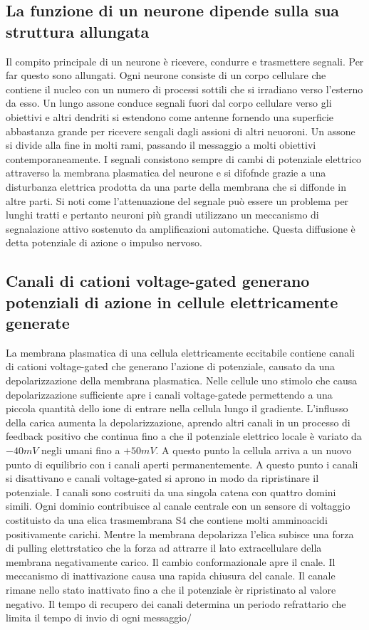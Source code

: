 \subsection{La funzione di un neurone dipende sulla sua struttura allungata}
Il compito principale di un neurone \`e ricevere, condurre e trasmettere segnali. Per far questo sono allungati. Ogni neurone consiste di un corpo cellulare che contiene il nucleo con
un numero di processi sottili che si irradiano verso l'esterno da esso. Un lungo assone conduce segnali fuori dal corpo cellulare verso gli obiettivi e altri dendriti si estendono
come antenne fornendo una superficie abbastanza grande per ricevere sengali dagli assioni di altri neuoroni. Un assone si divide alla fine in molti rami, passando il messaggio a 
molti obiettivi contemporaneamente. I segnali consistono sempre di cambi di potenziale elettrico attraverso la membrana plasmatica del neurone e si difofnde grazie a una disturbanza
elettrica prodotta da una parte della membrana che si diffonde in altre parti. Si noti come l'attenuazione del segnale pu\`o essere un problema per lunghi tratti e pertanto neuroni pi\`u
grandi utilizzano un meccanismo di segnalazione attivo sostenuto da amplificazioni automatiche. Questa diffusione \`e detta potenziale di azione o impulso nervoso. 
\subsection{Canali di cationi voltage-gated generano potenziali di azione in cellule elettricamente generate}
La membrana plasmatica di una cellula elettricamente eccitabile contiene canali di cationi voltage-gated che generano l'azione di potenziale, causato da una depolarizzazione della
membrana plasmatica. Nelle cellule uno stimolo che causa depolarizzazione sufficiente apre i canali voltage-gatede  permettendo a una piccola quantit\`a dello ione di entrare
nella cellula lungo il gradiente. L'influsso della carica aumenta la depolarizzazione, aprendo altri canali in un processo di feedback positivo che continua fino a che il potenziale
elettrico locale \`e variato da $-40mV$ negli umani fino a $+50mV$. A questo punto la cellula arriva a un nuovo punto di equilibrio con i canali  aperti permanentemente. A
questo punto i canali  si disattivano e canali voltage-gated  si aprono in modo da ripristinare il potenziale. I canali  sono costruiti da una singola catena
con quattro domini simili. Ogni dominio contribuisce al canale centrale con un sensore di voltaggio costituisto da una elica trasmembrana S4 che contiene molti amminoacidi positivamente
carichi. Mentre la membrana depolarizza l'elica subisce una forza di pulling elettrstatico che la forza ad attrarre il lato extracellulare della membrana negativamente carico. Il
cambio conformazionale apre il cnale. Il meccanismo di inattivazione causa una rapida chiusura del canale. Il canale rimane nello stato inattivato fino a che il potenziale
\`er ripristinato al valore negativo. Il tempo di recupero dei canali determina un periodo refrattario che limita il tempo di invio di ogni messaggio/ 

